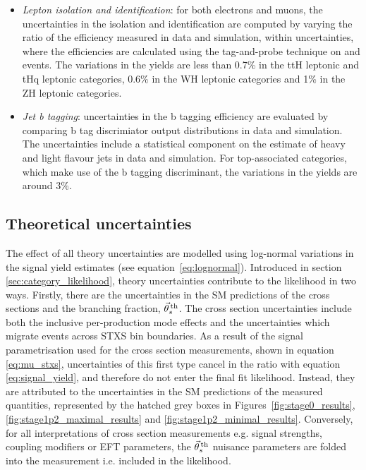 \begin{itemize}
    \item \textit{Lepton isolation and identification}: for both electrons and muons, the uncertainties in the isolation and identification are computed by varying the ratio of the efficiency measured in data and simulation, within uncertainties, where the efficiencies are calculated using the tag-and-probe technique on \Zee and \Zmumu events. The variations in the yields are less than 0.7\% in the ttH leptonic and tHq leptonic categories, 0.6\% in the WH leptonic categories and 1\% in the ZH leptonic categories. 
    
    \item \textit{Jet b tagging}: uncertainties in the b tagging efficiency are evaluated by comparing b tag discrimiator output distributions in data and simulation. The uncertainties include a statistical component on the estimate of heavy and light flavour jets in data and simulation. For top-associated categories, which make use of the b tagging discriminant, the variations in the yields are around 3\%.
\end{itemize}

\subsection{Theoretical uncertainties}\label{sec:systematics_theoretical}
The effect of all theory uncertainties are modelled using log-normal variations in the signal yield estimates (see equation~\ref{eq:lognormal}). Introduced in section \ref{sec:category_likelihood}, theory uncertainties contribute to the likelihood in two ways. Firstly, there are the uncertainties in the SM predictions of the cross sections and the \hgg branching fraction, $\vec{\theta}^{\,\rm{th}}_{s}$. The cross section uncertainties include both the inclusive per-production mode effects and the uncertainties which migrate events across STXS bin boundaries. As a result of the signal parametrisation used for the cross section measurements, shown in equation \ref{eq:mu_stxs}, uncertainties of this first type cancel in the ratio with equation \ref{eq:signal_yield}, and therefore do not enter the final fit likelihood. Instead, they are attributed to the uncertainties in the SM predictions of the measured quantities, represented by the hatched grey boxes in Figures~\ref{fig:stage0_results}, \ref{fig:stage1p2_maximal_results} and \ref{fig:stage1p2_minimal_results}. Conversely, for all interpretations of cross section measurements e.g. signal strengths, coupling modifiers or EFT parameters, the $\vec{\theta}^{\,\rm{th}}_{s}$ nuisance parameters are folded into the measurement i.e. included in the likelihood.

